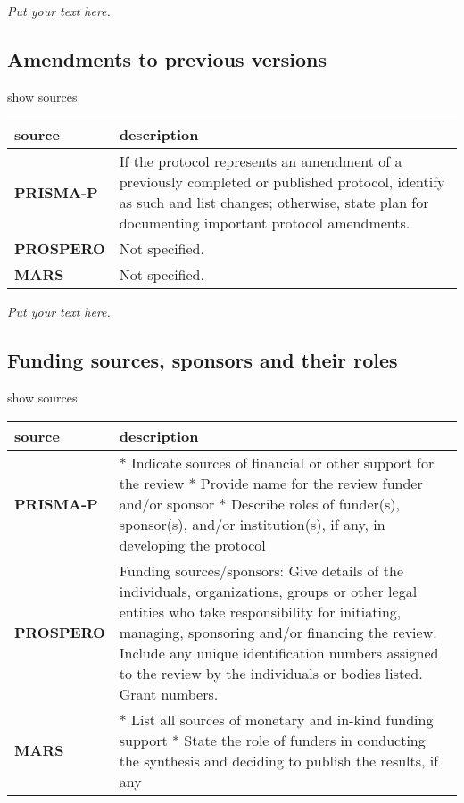 \documentclass[]{article}
\begin{document}
\emph{Put your text here.}

\hypertarget{amendments-to-previous-versions}{%
\subsection{Amendments to previous
versions}\label{amendments-to-previous-versions}}

show sources

\hypertarget{atpv}{}
\begin{table}[H]
\centering
\begin{tabular}{>{\bfseries}l|l}
\hline
\rowcolor[HTML]{ececec}  source & description\\
\hline
PRISMA-P & If the protocol represents an amendment of a previously completed or published protocol, identify as such and list changes; otherwise, state plan for documenting important protocol amendments.\\
\hline
PROSPERO & Not specified.\\
\hline
MARS & Not specified.\\
\hline
\end{tabular}
\end{table}

\emph{Put your text here.}

\hypertarget{funding-sources-sponsors-and-their-roles}{%
\subsection{Funding sources, sponsors and their
roles}\label{funding-sources-sponsors-and-their-roles}}

show sources

\hypertarget{fsign}{}
\begin{table}[H]
\centering
\begin{tabular}{>{\bfseries}l|l}
\hline
\rowcolor[HTML]{ececec}  source & description\\
\hline
PRISMA-P & * Indicate sources of financial or other support for the review
* Provide name for the review funder and/or sponsor
* Describe roles of funder(s), sponsor(s), and/or institution(s), if any, in developing the protocol\\
\hline
PROSPERO & Funding sources/sponsors: Give details of the individuals, organizations, groups or other legal entities who take responsibility for initiating, managing, sponsoring and/or financing the review. Include any unique identification numbers assigned to the review by the individuals or bodies listed. Grant numbers.\\
\hline
MARS & * List all sources of monetary and in-kind funding support
* State the role of funders in conducting the synthesis and deciding to publish the results, if any\\
\hline
\end{tabular}
\end{table}
\end{document}
